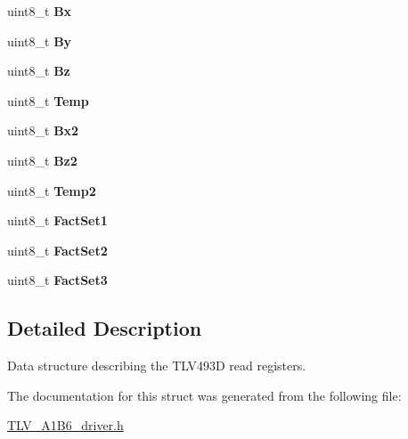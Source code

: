 \begin{DoxyCompactItemize}
\item 
\mbox{\label{struct_t_l_v493_d__regmap__read__t_a1d77ec1b71bec4e927c7f0426cc35d45}} 
uint8\+\_\+t {\bfseries Bx}
\item 
\mbox{\label{struct_t_l_v493_d__regmap__read__t_a0703567dce60a052cb92f8f7ca4e6e33}} 
uint8\+\_\+t {\bfseries By}
\item 
\mbox{\label{struct_t_l_v493_d__regmap__read__t_ac43ef97c2736f58edf3e6f742d5d5f8f}} 
uint8\+\_\+t {\bfseries Bz}
\item 
\mbox{\label{struct_t_l_v493_d__regmap__read__t_ac9de6390293aa8480ee3425f4e652e61}} 
uint8\+\_\+t {\bfseries Temp}
\item 
\mbox{\label{struct_t_l_v493_d__regmap__read__t_ae3b2c1ffdaa50d98a162b9cfb7f493ce}} 
uint8\+\_\+t {\bfseries Bx2}
\item 
\mbox{\label{struct_t_l_v493_d__regmap__read__t_a5636d40fe9b296a86a8f4663e4f1a1a0}} 
uint8\+\_\+t {\bfseries Bz2}
\item 
\mbox{\label{struct_t_l_v493_d__regmap__read__t_abac0ba541879acc2f7b2540b4d6cafaa}} 
uint8\+\_\+t {\bfseries Temp2}
\item 
\mbox{\label{struct_t_l_v493_d__regmap__read__t_a9d8ee9c7a835962965906a882fd0926f}} 
uint8\+\_\+t {\bfseries Fact\+Set1}
\item 
\mbox{\label{struct_t_l_v493_d__regmap__read__t_a50dbab2a95a5a1c77c9133589421aaf8}} 
uint8\+\_\+t {\bfseries Fact\+Set2}
\item 
\mbox{\label{struct_t_l_v493_d__regmap__read__t_acd017b6c607cc748f305f0355c8a512a}} 
uint8\+\_\+t {\bfseries Fact\+Set3}
\end{DoxyCompactItemize}


\subsection{Detailed Description}
Data structure describing the T\+L\+V493D read registers. 

The documentation for this struct was generated from the following file\+:\begin{DoxyCompactItemize}
\item 
\mbox{\hyperlink{_t_l_v___a1_b6__driver_8h}{T\+L\+V\+\_\+\+A1\+B6\+\_\+driver.\+h}}\end{DoxyCompactItemize}

